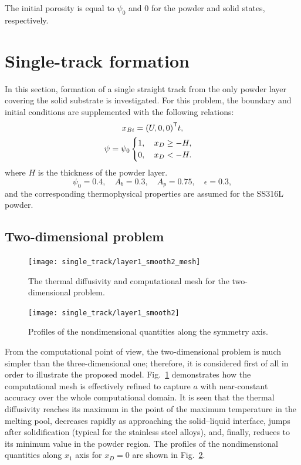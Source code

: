 \documentclass{article}
\newcommand{\transpose}[1]{#1^\mathsf{T}}
\begin{document}
The initial porosity is equal to \(\psi_0\) and \(0\) for the powder and solid states, respectively.

\section{Single-track formation}\label{sec:single-track}

In this section, formation of a single straight track from the only powder layer covering the solid substrate is investigated.
For this problem, the boundary and initial conditions are supplemented with the following relations:
\begin{gather}
    x_{Bi} = \transpose{\qty(U,0,0)}t, \label{eq:single:bc} \\
    \psi = \psi_0\begin{cases}
        1, \quad x_D \geq -H, \\
        0, \quad x_D < -H.
    \end{cases}\label{eq:single:ic}
\end{gather}
where \(H\) is the thickness of the powder layer.
\begin{equation}\label{eq:single:params}
    \psi_0 = 0.4, \quad A_b = 0.3, \quad A_p = 0.75, \quad \epsilon = 0.3,
\end{equation}
and the corresponding thermophysical properties are assumed for the SS316L powder.

\subsection{Two-dimensional problem}

\begin{figure}
    \centering
    \texttt{[image: single\_track/layer1\_smooth2\_mesh]}
    \caption{
        The thermal diffusivity and computational mesh for the two-dimensional problem.
    }\label{fig:2d:mesh}
\end{figure}

\begin{figure}
    \centering
    \texttt{[image: single\_track/layer1\_smooth2]}
    \caption{
        Profiles of the nondimensional quantities along the symmetry axis.
    }\label{fig:2d:profiles}
\end{figure}

From the computational point of view, the two-dimensional problem is much simpler than the three-dimensional one;
therefore, it is considered first of all in order to illustrate the proposed model.
Fig.~\ref{fig:2d:mesh} demonstrates how the computational mesh is effectively refined
to capture \(a\) with near-constant accuracy over the whole computational domain.
It is seen that the thermal diffusivity reaches its maximum in the point of the maximum temperature in the melting pool,
decreases rapidly as approaching the solid--liquid interface, jumps after solidification (typical for the stainless steel alloys),
and, finally, reduces to its minimum value in the powder region.
The profiles of the nondimensional quantities along \(x_1\) axis for \(x_D=0\) are shown in Fig.~\ref{fig:2d:profiles}.
\end{document}
